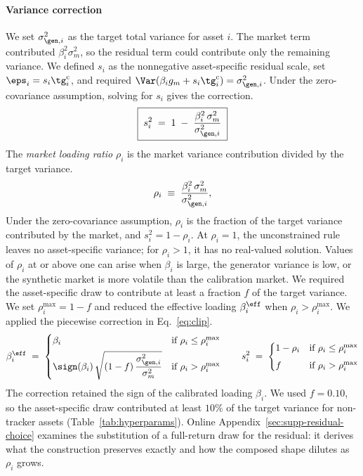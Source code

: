 \paragraph{Variance correction}

We set $\sigma_{\gen,i}^2$ as the target total variance for asset $i$.
The market term contributed $\beta_i^2\sigma_m^2$, so the residual term
could contribute only the remaining variance. We defined $s_i$ as the
nonnegative asset-specific residual scale, set
$\eps_i=s_i\tg_i^{\mathrm c}$, and required
$\Var(\beta_i g_m+s_i\tg_i^{\mathrm c})=\sigma_{\gen,i}^2$. Under the
zero-covariance assumption, solving for $s_i$ gives the correction.
\begin{equation}
  \boxed{\;s_i^2 \;=\; 1 \;-\; \frac{\beta_i^2\, \sigma_m^2}{\sigma_{\gen,i}^2}\;}
  \label{eq:scale}
\end{equation}
The \emph{market loading ratio} $\rho_i$ is the market variance
contribution divided by the target variance.
\begin{equation}
  \rho_i \;\equiv\; \frac{\beta_i^2\, \sigma_m^2}{\sigma_{\gen,i}^2},
  \label{eq:rho}
\end{equation}
Under the zero-covariance assumption, $\rho_i$ is the fraction of the
target variance contributed by the market, and $s_i^2=1-\rho_i$. At
$\rho_i=1$, the unconstrained rule leaves no asset-specific variance;
for $\rho_i>1$, it has no real-valued solution. Values of $\rho_i$ at or
above one can arise when $\beta_i$ is large, the generator variance is low, or the
synthetic market is more volatile than the calibration market. We
required the asset-specific draw to contribute at least a fraction $f$
of the target variance. We set $\rho_i^{\max}=1-f$ and reduced the
effective loading $\beta_i^{\eff}$ when $\rho_i>\rho_i^{\max}$. We
applied the piecewise correction in Eq.~\eqref{eq:clip}.
\begin{equation}
  \beta_i^{\eff} \;=\;
  \begin{cases}
    \beta_i & \text{if } \rho_i \le \rho_i^{\max} \\[4pt]
    \sign(\beta_i)\,\sqrt{(1 - f)\,\dfrac{\sigma_{\gen,i}^2}{\sigma_m^2}} & \text{if } \rho_i > \rho_i^{\max}
  \end{cases}
  \qquad
  s_i^2 \;=\;
  \begin{cases}
    1 - \rho_i & \text{if } \rho_i \le \rho_i^{\max} \\[4pt]
    f          & \text{if } \rho_i > \rho_i^{\max}
  \end{cases}
  \label{eq:clip}
\end{equation}
The correction retained the sign of the calibrated loading $\beta_i$.
We used $f=0.10$, so the asset-specific draw contributed at least
$10\%$ of the target variance for non-tracker assets
(Table~\ref{tab:hyperparams}). Online
Appendix~\ref{sec:supp-residual-choice} examines the substitution of
a full-return draw for the residual: it derives what the construction
preserves exactly and how the composed shape dilutes as $\rho_i$
grows.

